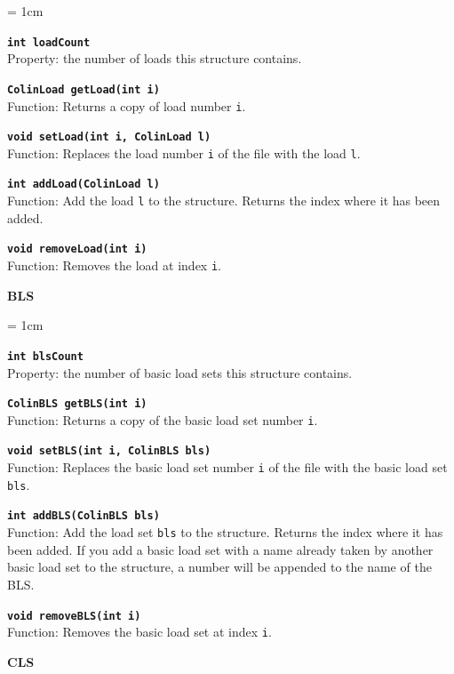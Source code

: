 \begin{trivlist}
		\begin{trivlist}
		\leftskip = 1cm
		\item[] \textbf{\texttt{int loadCount}}\\ Property: the number of loads this structure contains. 
		\item[] \textbf{\texttt{ColinLoad getLoad(int i)}}\\ Function: Returns a copy of load number \texttt{i}.
		\item[] \textbf{\texttt{void setLoad(int i, ColinLoad l)}}\\ Function: Replaces the load number \texttt{i} of the file with the load \texttt{l}.
		\item[] \textbf{\texttt{int addLoad(ColinLoad l)}}\\ Function: Add the load \texttt{l} to the structure. Returns the index where it has been added.
		\item[] \textbf{\texttt{void removeLoad(int i)}}\\ Function: Removes the load at index \texttt{i}.
	\end{trivlist}
	\item[]\textbf{BLS}
		\begin{trivlist}
		\leftskip = 1cm
		\item[] \textbf{\texttt{int blsCount}}\\ Property: the number of basic load sets this structure contains. 
		\item[] \textbf{\texttt{ColinBLS getBLS(int i)}}\\ Function: Returns a copy of the basic load set number \texttt{i}.
		\item[] \textbf{\texttt{void setBLS(int i, ColinBLS bls)}}\\ Function: Replaces the basic load set number \texttt{i} of the file with the basic load set \texttt{bls}.
		\item[] \textbf{\texttt{int addBLS(ColinBLS bls)}}\\ Function: Add the load set \texttt{bls} to the structure. Returns the index where it has been added. If you add a basic load set with a name already taken by another basic load set to the structure, a number will be appended to the name of the BLS.
		\item[] \textbf{\texttt{void removeBLS(int i)}}\\ Function: Removes the basic load set at index \texttt{i}.
	\end{trivlist}
	\item[]\textbf{CLS}

\end{trivlist}
